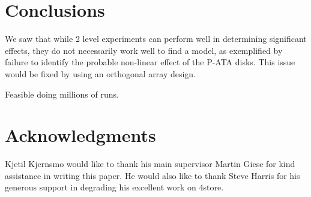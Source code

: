 \documentclass{llncs}
\begin{document}
\section{Conclusions}

We saw that while 2 level experiments can perform well in determining
significant effects, they do not necessarily work well to find a
model, as exemplified by failure to identify the probable non-linear
effect of the P-ATA disks. This issue would be fixed by using an
orthogonal array design.

 
Feasible doing millions of runs.



\section*{Acknowledgments}

Kjetil Kjernsmo would like to thank his main supervisor Martin Giese
for kind assistance in writing this paper. He would also like to
thank Steve Harris for his generous support in degrading his excellent
work on 4store.


%
%
%


\end{document}
